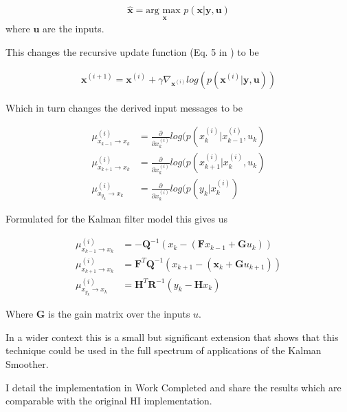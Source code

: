 \documentclass[]{../resources/final_report}
\begin{document}
\begin{align}
  \hat{\textbf{x}} = \underset{\textbf{x}}{\text{arg max }} p(\textbf{x} | \textbf{y}, \textbf{u}) 
\end{align}
where $\textbf{u}$ are the inputs.

This changes the recursive update function (Eq. 5 in \cite{Satorras2019CombiningGA}) to be 

\begin{align}
  \textbf{x}^{(i+1)} = \textbf{x}^{(i)} + \gamma \nabla_{\textbf{x}^{(i)}}log(p(\textbf{x}^{(i)} | \textbf{y}, \textbf{u}))
\end{align}


Which in turn changes the derived input messages to be 

\begin{align}
  \mu_{x_{k-1} \rightarrow x_k}^{(i)} &= \frac{\partial}{\partial x_k^{(i)}} log(p(x_k^{(i)}|x_{k-1}^{(i)}, u_{k})\\
  \mu_{x_{k+1} \rightarrow x_k}^{(i)} &= \frac{\partial}{\partial x_k^{(i)}} log(p(x_{k+1}^{(i)}|x_{k}^{(i)}, u_{k})\\
  \mu_{x_{y_k} \rightarrow x_k}^{(i)} &= \frac{\partial}{\partial x_k^{(i)}} log(p(y_{k}|x_{k}^{(i)})
\end{align}


Formulated for the Kalman filter model this gives us

\begin{align}
  \mu_{x_{k-1} \rightarrow x_k}^{(i)} &= -\textbf{Q}^{-1}(x_k - (\textbf{F}x_{k-1} +\textbf{G}u_k))\\
  \mu_{x_{k+1} \rightarrow x_k}^{(i)} &= \textbf{F}^T\textbf{Q}^{-1}(x_{k+1} - (\textbf{x}_k + \textbf{G}u_{k+1}))\\
  \mu_{x_{y_k} \rightarrow x_k}^{(i)} &= \textbf{H}^T\textbf{R}^{-1}(y_k - \textbf{H}x_k)
\end{align}

Where $\textbf{G}$ is the gain matrix over the inputs $u$.

In a wider context this is a small but significant extension that shows that this technique
could be used in the full spectrum of applications of the Kalman Smoother. 

I detail the implementation in Work Completed and share the results which are comparable 
with the original HI implementation.
\end{document}

